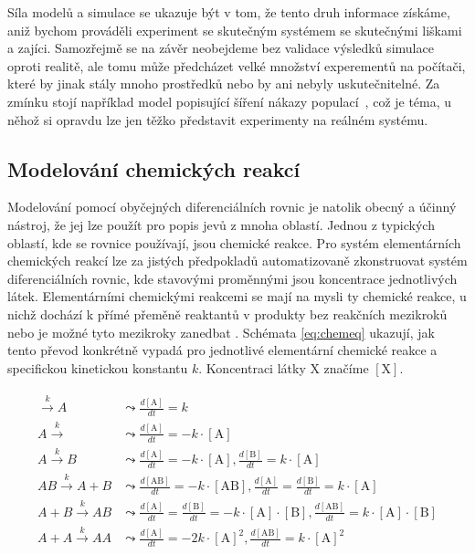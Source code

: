 Síla modelů a simulace se ukazuje být v tom, že tento druh informace získáme, aniž bychom prováděli
experiment se skutečným systémem se  skutečnými liš\-ka\-mi a zajíci. Samozřejmě se na závěr neobejdeme
bez validace výsledků simulace oproti realitě, ale tomu může předcházet velké množství
experementů na počítači, které by jinak stály mnoho prostředků nebo by ani 
nebyly uskutečnitelné. Za zmínku stojí například model popisující šíření nákazy
populací~\cite{kermack1927}, což je téma, u něhož si opravdu lze jen těžko představit
experimenty na reálném systému.

\subsection{Modelování chemických reakcí}

Modelování pomocí obyčejných diferenciálních rovnic je natolik obecný a účinný nástroj,
že jej lze použít pro popis jevů z mnoha oblastí. Jednou z typických oblastí, kde
se rovnice používají, jsou chemické reakce. Pro systém elementárních chemických reakcí
lze za jistých předpokladů \cite{TODO} automatizovaně zkonstruovat systém diferenciálních rovnic,
kde stavovými proměnnými jsou koncentrace jednotlivých látek. Elementárními che\-mic\-ký\-mi
reakcemi se mají na mysli ty chemické reakce, u nichž dochází k přímé přeměně reaktantů
v produkty bez reakčních mezikroků nebo je možné tyto mezikroky zanedbat \cite{horn1972}.
Schémata \ref{eq:chemeq} ukazují, jak tento převod konkrétně vypadá pro jednotlivé
elementární chemické reakce a specifickou kinetickou konstantu $k$. Koncentraci látky
$\textrm{X}$ značíme $[\textrm{X}]$.

\begin{align}\label{eq:chemeq}
\begin{array}{ll}
\xrightarrow{k} A			&\leadsto \frac{d[\textrm{A}]}{dt} = k						\\
A \xrightarrow{k} 			&\leadsto \frac{d[\textrm{A}]}{dt} = - k \cdot [\textrm{A}]	\\
A \xrightarrow{k} B			&\leadsto \frac{d[\textrm{A}]}{dt} = - k \cdot [\textrm{A}], \frac{d[\textrm{B}]}{dt} = k \cdot [\textrm{A}] \\
AB \xrightarrow{k} A + B	&\leadsto \frac{d[\textrm{AB}]}{dt} = - k \cdot [\textrm{AB}], \frac{d[\textrm{A}]}{dt} = \frac{d[\textrm{B}]}{dt} = k \cdot [\textrm{A}] \\
A + B \xrightarrow{k} AB	&\leadsto \frac{d[\textrm{A}]}{dt} = \frac{d[\textrm{B}]}{dt} = - k \cdot [\textrm{A}] \cdot [\textrm{B}], \frac{d[\textrm{AB}]}{dt} = k \cdot [\textrm{A}] \cdot [\textrm{B}] \\
A + A \xrightarrow{k} AA	&\leadsto \frac{d[\textrm{A}]}{dt} = - 2k \cdot [\textrm{A}]^2, \frac{d[\textrm{AB}]}{dt} = k \cdot [\textrm{A}]^2 \\
\end{array}
\end{align}

